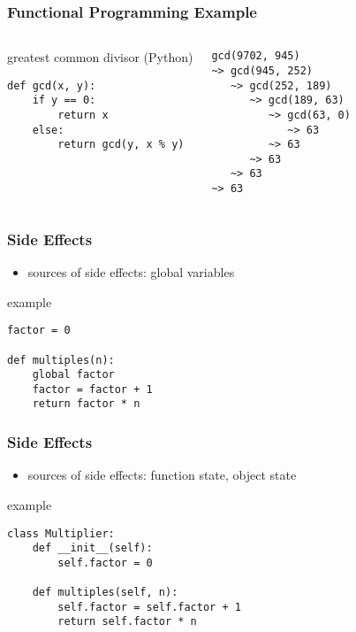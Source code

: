 \documentclass[dvipsnames]{beamer}
\theoremstyle{plain}
\begin{document}
\begin{frame}[fragile]
  \frametitle{Functional Programming Example}

  \begin{columns}
    \begin{exampleblock}{greatest common divisor (Python)}
      \begin{lstlisting}
def gcd(x, y):
    if y == 0:
        return x
    else:
        return gcd(y, x % y)
      \end{lstlisting}
    \end{exampleblock}

    \begin{lstlisting}[frame=single]
gcd(9702, 945)
~> gcd(945, 252)
   ~> gcd(252, 189)
      ~> gcd(189, 63)
         ~> gcd(63, 0)
            ~> 63
         ~> 63
      ~> 63
   ~> 63
~> 63
    \end{lstlisting}
  \end{columns}
\end{frame}

\begin{frame}[fragile]
  \frametitle{Side Effects}

  \begin{itemize}
    \item sources of side effects: global variables
  \end{itemize}

  \begin{exampleblock}{example}
    \begin{lstlisting}
factor = 0

def multiples(n):
    global factor
    factor = factor + 1
    return factor * n
    \end{lstlisting}
  \end{exampleblock}
\end{frame}

\begin{frame}[fragile]
  \frametitle{Side Effects}

  \begin{itemize}
    \item sources of side effects: function state, object state
  \end{itemize}

  \begin{exampleblock}{example}
    \begin{lstlisting}
class Multiplier:
    def __init__(self):
        self.factor = 0

    def multiples(self, n):
        self.factor = self.factor + 1
        return self.factor * n
    \end{lstlisting}
  \end{exampleblock}
\end{frame}
\end{document}
